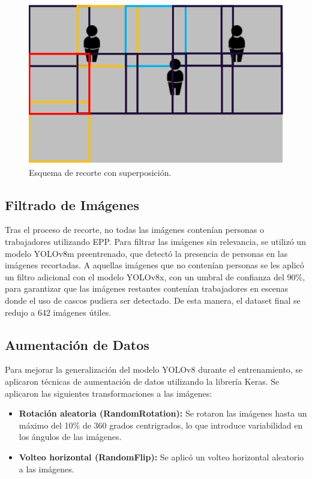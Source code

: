 \begin{itemize}
\begin{figure}[!ht]
  \centering
  \includegraphics[width=.49\linewidth]{images/full_cropping.png}
  \caption{Esquema de recorte con superposición.}
  \label{fig:full_cropping}
\end{figure}

\end{itemize}

\subsection{Filtrado de Imágenes}

Tras el proceso de recorte, no todas las imágenes contenían personas o trabajadores utilizando EPP. Para filtrar las imágenes sin relevancia, se utilizó un modelo YOLOv8m preentrenado, que detectó la presencia de personas en las imágenes recortadas. A aquellas imágenes que no contenían personas se les aplicó un filtro adicional con el modelo YOLOv8x, con un umbral de confianza del 90\%, para garantizar que las imágenes restantes contenían trabajadores en escenas donde el uso de cascos pudiera ser detectado. De esta manera, el dataset final se redujo a 642 imágenes útiles.

\subsection{Aumentación de Datos}

Para mejorar la generalización del modelo YOLOv8 durante el entrenamiento, se aplicaron técnicas de aumentación de datos utilizando la librería Keras. Se aplicaron las siguientes transformaciones a las imágenes:

\begin{itemize}
  \item \textbf{Rotación aleatoria (RandomRotation):}  Se rotaron las imágenes hasta un máximo del 10\% de 360 grados centrigrados, lo que introduce variabilidad en los ángulos de las imágenes.
  \item \textbf{Volteo horizontal (RandomFlip):} Se aplicó un volteo horizontal aleatorio a las imágenes.
\end{itemize}


